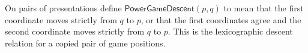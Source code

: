 \begin{definition}
On pairs of presentations define
$\mathsf{PowerGameDescent}(p,q)$ to mean that the first coordinate moves
strictly from $q$ to $p$, or that the first coordinates agree and the second
coordinate moves strictly from $q$ to $p$.  This is the lexicographic
descent relation for a copied pair of game positions.
\end{definition}
